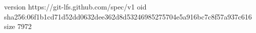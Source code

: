 version https://git-lfs.github.com/spec/v1
oid sha256:06f1b1cd71d52dd0632dee362d8d53246985275704e5a916bc7c8f57a937c616
size 7972
